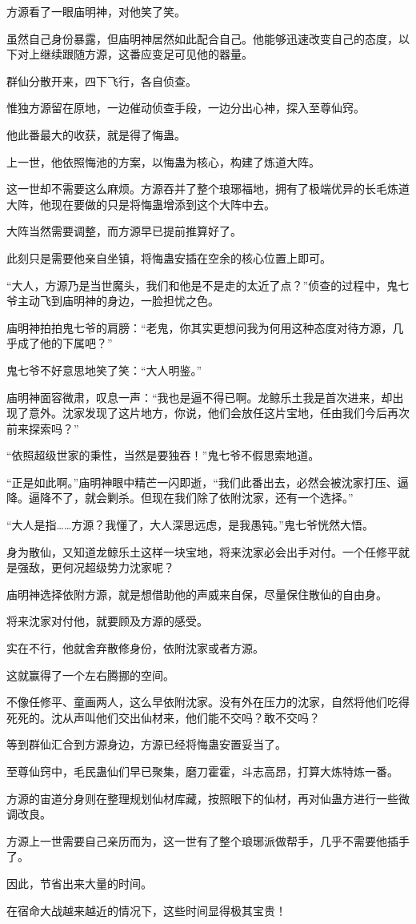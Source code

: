 \begin{this_body}
方源看了一眼庙明神，对他笑了笑。

虽然自己身份暴露，但庙明神居然如此配合自己。他能够迅速改变自己的态度，以下对上继续跟随方源，这番应变足可见他的器量。

群仙分散开来，四下飞行，各自侦查。

惟独方源留在原地，一边催动侦查手段，一边分出心神，探入至尊仙窍。

他此番最大的收获，就是得了悔蛊。

上一世，他依照悔池的方案，以悔蛊为核心，构建了炼道大阵。

这一世却不需要这么麻烦。方源吞并了整个琅琊福地，拥有了极端优异的长毛炼道大阵，他现在要做的只是将悔蛊增添到这个大阵中去。

大阵当然需要调整，而方源早已提前推算好了。

此刻只是需要他亲自坐镇，将悔蛊安插在空余的核心位置上即可。

“大人，方源乃是当世魔头，我们和他是不是走的太近了点？”侦查的过程中，鬼七爷主动飞到庙明神的身边，一脸担忧之色。

庙明神拍拍鬼七爷的肩膀：“老鬼，你其实更想问我为何用这种态度对待方源，几乎成了他的下属吧？”

鬼七爷不好意思地笑了笑：“大人明鉴。”

庙明神面容微肃，叹息一声：“我也是逼不得已啊。龙鲸乐土我是首次进来，却出现了意外。沈家发现了这片地方，你说，他们会放任这片宝地，任由我们今后再次前来探索吗？”

“依照超级世家的秉性，当然是要独吞！”鬼七爷不假思索地道。

“正是如此啊。”庙明神眼中精芒一闪即逝，“我们此番出去，必然会被沈家打压、逼降。逼降不了，就会剿杀。但现在我们除了依附沈家，还有一个选择。”

“大人是指……方源？我懂了，大人深思远虑，是我愚钝。”鬼七爷恍然大悟。

身为散仙，又知道龙鲸乐土这样一块宝地，将来沈家必会出手对付。一个任修平就是强敌，更何况超级势力沈家呢？

庙明神选择依附方源，就是想借助他的声威来自保，尽量保住散仙的自由身。

将来沈家对付他，就要顾及方源的感受。

实在不行，他就舍弃散修身份，依附沈家或者方源。

这就赢得了一个左右腾挪的空间。

不像任修平、童画两人，这么早依附沈家。没有外在压力的沈家，自然将他们吃得死死的。沈从声叫他们交出仙材来，他们能不交吗？敢不交吗？

等到群仙汇合到方源身边，方源已经将悔蛊安置妥当了。

至尊仙窍中，毛民蛊仙们早已聚集，磨刀霍霍，斗志高昂，打算大炼特炼一番。

方源的宙道分身则在整理规划仙材库藏，按照眼下的仙材，再对仙蛊方进行一些微调改良。

方源上一世需要自己亲历而为，这一世有了整个琅琊派做帮手，几乎不需要他插手了。

因此，节省出来大量的时间。

在宿命大战越来越近的情况下，这些时间显得极其宝贵！

\end{this_body}

